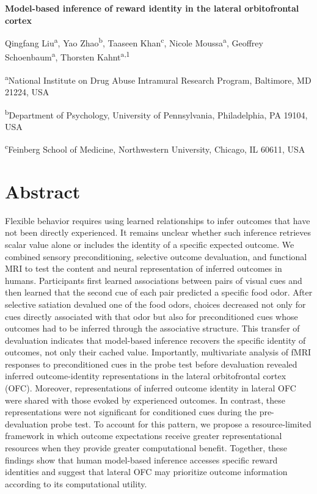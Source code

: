 \documentclass[12pt,letterpaper]{article}
\DeclareRobustCommand{\hl}{\textcolor{reviewtext}}
\begin{document}
\raggedright

\begin{center}

{\Large\bfseries Model-based inference of reward identity in the lateral orbitofrontal cortex\par}

\medskip

Qingfang Liu\textsuperscript{a}, Yao Zhao\textsuperscript{b}, Taaseen Khan\textsuperscript{c}, Nicole Moussa\textsuperscript{a}, Geoffrey Schoenbaum\textsuperscript{a}, Thorsten Kahnt\textsuperscript{a,1}\par

\medskip

\textsuperscript{a}National Institute on Drug Abuse Intramural Research Program, Baltimore, MD 21224, USA\par

\textsuperscript{b}Department of Psychology, University of Pennsylvania,
Philadelphia, PA 19104, USA\par

\textsuperscript{c}Feinberg School of Medicine, Northwestern University,
Chicago, IL 60611, USA\par

\end{center}


\section*{Abstract}
Flexible behavior requires using learned relationships to infer outcomes that have not been directly experienced. It remains unclear whether such inference retrieves scalar value alone or includes the identity of a specific expected outcome. We combined sensory preconditioning, selective outcome devaluation, and functional MRI to test the content and neural representation of inferred outcomes in humans. Participants first learned associations between pairs of visual cues and then learned that the second cue of each pair predicted a specific food odor. After selective satiation devalued one of the food odors, choices decreased not only for cues directly associated with that odor but also for preconditioned cues whose outcomes had to be inferred through the associative structure. This transfer of devaluation indicates that model-based inference recovers the specific identity of outcomes, not only their cached value. Importantly, multivariate analysis of fMRI responses to preconditioned cues in the probe test before devaluation revealed inferred outcome-identity representations in the lateral orbitofrontal cortex (OFC). Moreover, representations of inferred outcome identity in lateral OFC were shared with those evoked by experienced outcomes. In contrast, these representations were not significant for conditioned cues \hl{during the pre-devaluation probe test}. To account for this pattern, we propose a resource-limited framework in which outcome expectations receive greater representational resources when they provide greater computational benefit. Together, these findings show that human model-based inference accesses specific reward identities and suggest that lateral OFC may prioritize outcome information according to its computational utility.
\end{document}
